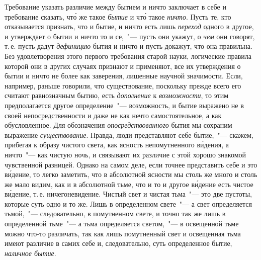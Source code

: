 Требование указать различие между бытием и ничто
заключает в себе и требование сказать, чт\'о же такое
\emph{бытие} и чт\'о такое \emph{ничто}. Пусть те, кто отказывается признать,
что и бытие, и ничто есть лишь \emph{переход} одного в
другое, и утверждает о бытии и ничто то и се,~"--- пусть
они укажут, о \emph{чем} они говорят, т.\,е. пусть дадут \emph{дефиницию}
бытия и ничто и пусть докажут, что она правильна.
Без удовлетворения этого первого требования старой науки,
логические правила которой они в других случаях
признают и применяют, все их утверждения о бытии и
ничто не более как заверения, лишенные научной значимости.
Если, например, раньше говорили, что существование,
поскольку прежде всего его считают равнозначным
бытию, есть \emph{дополнение} к \emph{возможности}, то этим предполагается
другое определение~"--- возможность, и бытие выражено
не в своей непосредственности и даже не как нечто
самостоятельное, а как обусловленное. Для обозначения
\emph{опосредствованного} бытия мы сохраним выражение
\emph{существование}. Правда, люди представляют себе бытие,~"---
скажем, прибегая к образу чистого света, как ясность непомутненного
в\'идения, а ничто~"--- как чистую ночь, и связывают
их различие с этой хорошо знакомой чувственной
разницей. Однако на самом деле, если точнее представить
себе и это в\'идение, то легко заметить, что в абсолютной
ясности мы столь же много и столь же мало видим, как
и в абсолютной тьме, что и то и другое в\'идение есть чистое
в\'идение, т.\,е. ничегоневидение. Чистый свет и чистая
тьма~"--- это две пустоты, которые суть одно и то же. Лишь
в определенном свете~"--- а свет определяется тьмой,~"--- следовательно,
в помутненном свете, и точно так же лишь
в определенной тьме~"--- а тьма определяется светом,~"--- в
освещенной тьме можно что-то различать, так как лишь
помутненный свет и освещенная тьма имеют различие в
самих себе и, следовательно, суть определенное бытие,
\emph{наличное бытие}.


